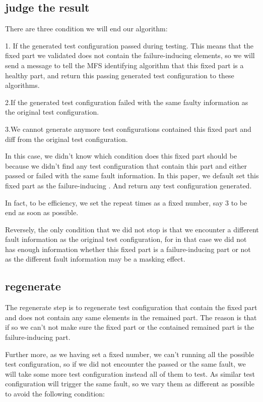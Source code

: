 \documentclass{sig-alternate}
\begin{document}
\subsection{judge the result}
There are three condition we will end our algorithm:

1. If the generated test configuration passed during testing. This means that the fixed part we validated does not contain the failure-inducing elements, so we will send a message to tell the MFS identifying algorithm that this fixed part is a healthy part, and return this passing generated test configuration to these algorithms.

2.If the generated test configuration failed with the same faulty information as the original test configuration.


3.We cannot generate anymore test configurations contained this fixed part and diff from the original test configuration.

In this case, we didn't know which condition does this fixed part should be because we didn't find any test configuration that contain this part and either passed or failed with the same fault information. In this paper, we default set this fixed part as the failure-inducing . And return any test configuration generated.

In fact, to be efficiency, we set the repeat times as a fixed number, say 3 to be end as soon as possible.

Reversely, the only condition that we did not stop is that we encounter a different fault information as the original test configuration, for in that case we did not has enough information whether this fixed part is a failure-inducing part or not as the different fault information may be a masking effect.

\subsection{regenerate}
The regenerate step is to regenerate test configuration that contain the fixed part and does not contain any same elements in the remained part. The reason is that if so we can't not make sure the fixed part or the contained remained part is the failure-inducing part.

Further more, as we having set a fixed number, we can't running all the possible test configuration, so if we did not encounter the passed or the same fault, we will take some more test configuration instead all of them to test. As similar test configuration will trigger the same fault, so we vary them as different as possible to avoid the following condition:
\end{document}
